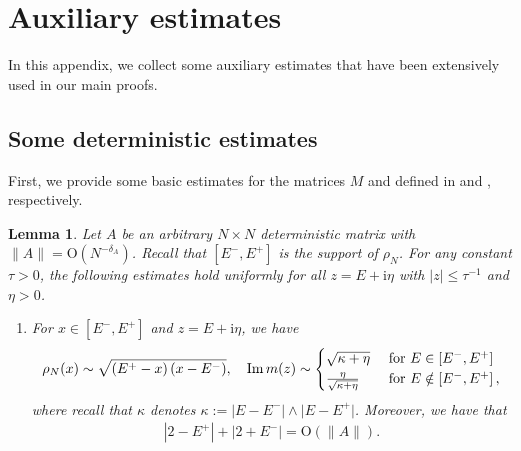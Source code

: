 \documentclass[10pt,reqno]{amsart}
\numberwithin{equation}{section}
\numberwithin{figure}{section}
\theoremstyle{plain} %
\newtheorem{lemma}[theorem]{Lemma}
\theoremstyle{definition} %
\newcommand{\wh}{\widehat}
\renewcommand{\txt}[1]{\text{\rm{#1}}}
\newcommand{\ii}{\mathrm{i}}
\newcommand{\pa}[1]{\left({#1}\right)}
\newcommand{\qa}[1]{\left[{#1}\right]}
\newcommand{\abs}[1]{\lvert #1 \rvert}
\newcommand{\absa}[1]{\left\lvert #1 \right\rvert}
\DeclareMathOperator{\im}{\mathrm{Im}}
\newcommand{\OO}{\mathrm{O}}
\numberwithin{equation}{section}
\begin{document}
\appendix


\section{Auxiliary estimates}\label{appendix}

In this appendix, we collect some auxiliary estimates that have been extensively used in our main proofs. 

\subsection{Some deterministic estimates}
First, we provide some basic estimates for the matrices $M$ and \smash{$\wh M$} defined in  and , respectively.

\begin{lemma}\label{lemma_usual_properties_of_m_and_mu}
 Let $A$ be an arbitrary $N\times N$ deterministic matrix with $\|A\|=\OO(N^{-\delta_A})$. Recall that $\qa{E^-,E^+}$ is the support of $\rho_N$. For any constant $\tau>0$, the following estimates hold uniformly for all $z=E+\ii\eta $ with $|z|\le \tau^{-1}$ and $\eta > 0$. 
    
    \begin{enumerate}
        
        \item For $x\in \qa{E^-,E^+}$ and $z=E+\ii \eta$, we have
        \begin{equation}\label{square_root_density}
            \begin{aligned}
                \rho_N(x)\sim \sqrt{\pa{E^+-x}\pa{x-E^-}},\quad\im m(z)\sim
                \begin{cases}
                    \sqrt{\kappa+\eta} & \txt{ for } E\in\qa{E^-,E^+}\\
                    \frac{\eta}{\sqrt{\kappa+\eta}} & \txt{ for } E\notin \qa{E^-,E^+},
                \end{cases}
            \end{aligned}
        \end{equation}
        where recall that $\kappa$ denotes $\kappa:=\abs{E-E^-}\wedge\abs{E-E^+}$. Moreover, we have that        \begin{equation}\label{edge_close_to_edge_sc}
            \begin{aligned}
                \absa{2-E^+}+\absa{2+E^-}=\OO\pa{\|A\|}.
            \end{aligned}
        \end{equation}


\end{enumerate}
\end{lemma}
\end{document}
